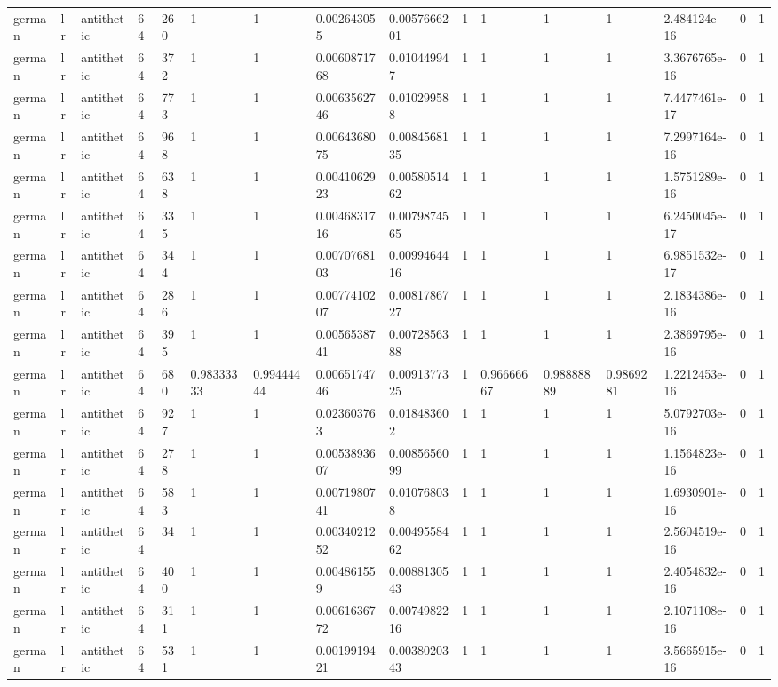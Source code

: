 \begin{tabular}{llllllllllllllll}
german & lr & antithetic & 64 & 260 & 1 & 1 & 0.002643055 & 0.0057666201 & 1 & 1 & 1 & 1 & 2.484124e-16 & 0 & 1 \\
german & lr & antithetic & 64 & 372 & 1 & 1 & 0.0060871768 & 0.010449947 & 1 & 1 & 1 & 1 & 3.3676765e-16 & 0 & 1 \\
german & lr & antithetic & 64 & 773 & 1 & 1 & 0.0063562746 & 0.010299588 & 1 & 1 & 1 & 1 & 7.4477461e-17 & 0 & 1 \\
german & lr & antithetic & 64 & 968 & 1 & 1 & 0.0064368075 & 0.0084568135 & 1 & 1 & 1 & 1 & 7.2997164e-16 & 0 & 1 \\
german & lr & antithetic & 64 & 638 & 1 & 1 & 0.0041062923 & 0.0058051462 & 1 & 1 & 1 & 1 & 1.5751289e-16 & 0 & 1 \\
german & lr & antithetic & 64 & 335 & 1 & 1 & 0.0046831716 & 0.0079874565 & 1 & 1 & 1 & 1 & 6.2450045e-17 & 0 & 1 \\
german & lr & antithetic & 64 & 344 & 1 & 1 & 0.0070768103 & 0.0099464416 & 1 & 1 & 1 & 1 & 6.9851532e-17 & 0 & 1 \\
german & lr & antithetic & 64 & 286 & 1 & 1 & 0.0077410207 & 0.0081786727 & 1 & 1 & 1 & 1 & 2.1834386e-16 & 0 & 1 \\
german & lr & antithetic & 64 & 395 & 1 & 1 & 0.0056538741 & 0.0072856388 & 1 & 1 & 1 & 1 & 2.3869795e-16 & 0 & 1 \\
german & lr & antithetic & 64 & 680 & 0.98333333 & 0.99444444 & 0.0065174746 & 0.0091377325 & 1 & 0.96666667 & 0.98888889 & 0.9869281 & 1.2212453e-16 & 0 & 1 \\
german & lr & antithetic & 64 & 927 & 1 & 1 & 0.023603763 & 0.018483602 & 1 & 1 & 1 & 1 & 5.0792703e-16 & 0 & 1 \\
german & lr & antithetic & 64 & 278 & 1 & 1 & 0.0053893607 & 0.0085656099 & 1 & 1 & 1 & 1 & 1.1564823e-16 & 0 & 1 \\
german & lr & antithetic & 64 & 583 & 1 & 1 & 0.0071980741 & 0.010768038 & 1 & 1 & 1 & 1 & 1.6930901e-16 & 0 & 1 \\
german & lr & antithetic & 64 & 34 & 1 & 1 & 0.0034021252 & 0.0049558462 & 1 & 1 & 1 & 1 & 2.5604519e-16 & 0 & 1 \\
german & lr & antithetic & 64 & 400 & 1 & 1 & 0.004861559 & 0.0088130543 & 1 & 1 & 1 & 1 & 2.4054832e-16 & 0 & 1 \\
german & lr & antithetic & 64 & 311 & 1 & 1 & 0.0061636772 & 0.0074982216 & 1 & 1 & 1 & 1 & 2.1071108e-16 & 0 & 1 \\
german & lr & antithetic & 64 & 531 & 1 & 1 & 0.0019919421 & 0.0038020343 & 1 & 1 & 1 & 1 & 3.5665915e-16 & 0 & 1 \\

\end{tabular}

